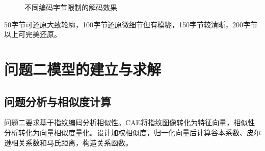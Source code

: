 \documentclass{whutmod}
\begin{document}
\begin{figure}[H]
                \caption{不同编码字节限制的解码效果}\label{fisg}
            \end{figure}

            50字节可还原大致轮廓，100字节还原微细节但有模糊，150字节较清晰，200字节以上可完美还原。

    \section{问题二模型的建立与求解}
        \subsection{问题分析与相似度计算}
            问题二要求基于指纹编码分析相似性。CAE将指纹图像转化为特征向量，相似性分析转化为向量相似度量化。设计加权相似度，归一化向量后计算谷本系数、皮尔逊相关系数和马氏距离，构造关系函数。
\end{document}
